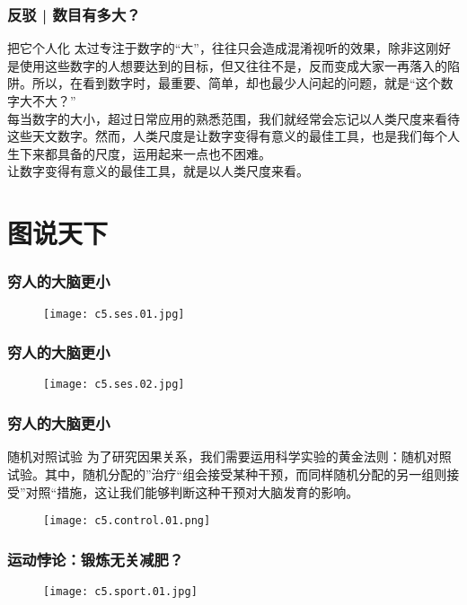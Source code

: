 \begin{frame}
  \frametitle{反驳 | 数目有多大？}
  \begin{block}{把它个人化}
  太过专注于数字的“大”，往往只会造成混淆视听的效果，除非这刚好是使用这些数字的人想要达到的目标，但又往往不是，反而变成大家一再落入的陷阱。所以，在看到数字时，最重要、简单，却也最少人问起的问题，就是“这个数字大不大？”\\
  \vspace{0.5em}
  每当数字的大小，超过日常应用的熟悉范围，我们就经常会忘记以人类尺度来看待这些天文数字。然而，人类尺度是让数字变得有意义的最佳工具，也是我们每个人生下来都具备的尺度，运用起来一点也不困难。\\
  \vspace{0.5em}
  让数字变得有意义的最佳工具，就是以人类尺度来看。
  \end{block}
\end{frame}

\section{图说天下}
\begin{frame}
  \frametitle{穷人的大脑更小}
  \begin{figure}
    \centering
    \texttt{[image: c5.ses.01.jpg]}
  \end{figure}
\end{frame}

\begin{frame}
  \frametitle{穷人的大脑更小}
  \begin{figure}
    \centering
    \texttt{[image: c5.ses.02.jpg]}
  \end{figure}
\end{frame}

\begin{frame}
  \frametitle{穷人的大脑更小}
  \begin{block}{随机对照试验}
为了研究因果关系，我们需要运用科学实验的黄金法则：随机对照试验。其中，随机分配的”治疗“组会接受某种干预，而同样随机分配的另一组则接受”对照“措施，这让我们能够判断这种干预对大脑发育的影响。
  \end{block}
  \begin{figure}
    \centering
    \texttt{[image: c5.control.01.png]}
  \end{figure}
\end{frame}

\begin{frame}
  \frametitle{运动悖论：锻炼无关减肥？}
  \begin{figure}
    \centering
    \texttt{[image: c5.sport.01.jpg]}
  \end{figure}
\end{frame}



